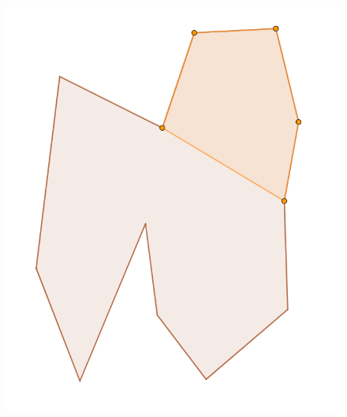 \documentclass[12pt]{article}
\begin{document}
\begin{figure}[H]
    \caption{}
    \label{fig:intersectionPolygonSection4}
    \endminipage\hfill
    \includegraphics[width=\linewidth]{Images/intersection_yMonotoneSection5.png}
    \caption{}
    \label{fig:intersectionPolygonSection5}
    \endminipage
\end{figure}
\end{document}
